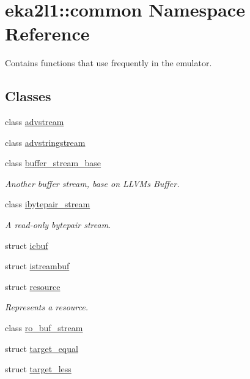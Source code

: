 \hypertarget{namespaceeka2l1_1_1common}{}\section{eka2l1\+:\+:common Namespace Reference}
\label{namespaceeka2l1_1_1common}


Contains functions that use frequently in the emulator.  


\subsection*{Classes}
\begin{DoxyCompactItemize}
\item 
class \mbox{\hyperlink{classeka2l1_1_1common_1_1advstream}{advstream}}
\item 
class \mbox{\hyperlink{classeka2l1_1_1common_1_1advstringstream}{advstringstream}}
\item 
class \mbox{\hyperlink{classeka2l1_1_1common_1_1buffer__stream__base}{buffer\+\_\+stream\+\_\+base}}
\begin{DoxyCompactList}\small\item\em Another buffer stream, base on L\+L\+VM\textquotesingle{}s Buffer. \end{DoxyCompactList}\item 
class \mbox{\hyperlink{classeka2l1_1_1common_1_1ibytepair__stream}{ibytepair\+\_\+stream}}
\begin{DoxyCompactList}\small\item\em A read-\/only bytepair stream. \end{DoxyCompactList}\item 
struct \mbox{\hyperlink{structeka2l1_1_1common_1_1icbuf}{icbuf}}
\item 
struct \mbox{\hyperlink{structeka2l1_1_1common_1_1istreambuf}{istreambuf}}
\item 
struct \mbox{\hyperlink{structeka2l1_1_1common_1_1resource}{resource}}
\begin{DoxyCompactList}\small\item\em Represents a resource. \end{DoxyCompactList}\item 
class \mbox{\hyperlink{classeka2l1_1_1common_1_1ro__buf__stream}{ro\+\_\+buf\+\_\+stream}}
\item 
struct \mbox{\hyperlink{structeka2l1_1_1common_1_1target__equal}{target\+\_\+equal}}
\item 
struct \mbox{\hyperlink{structeka2l1_1_1common_1_1target__less}{target\+\_\+less}}
\end{DoxyCompactItemize}
